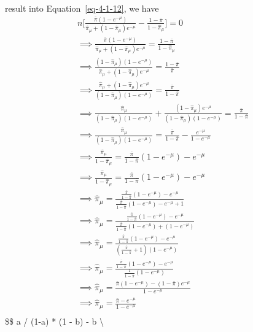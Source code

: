 \documentclass[
  12pt]{article}
\begin{document}
result into Equation~\ref{eq-4-1-12}, we have \[
\begin{aligned}
&n \Bigg[\frac{\bar{\pi}(1 - e^{-\mu})}{\hat{\pi}_{\mu} + (1-\hat{\pi}_{\mu})e^{-\mu}} - \frac{1 - \bar{\pi}}{1 - \hat{\pi}_{\mu}} \Bigg] = 0 \\
&\implies \frac{\bar{\pi}(1 - e^{-\mu})}{\hat{\pi}_{\mu} + (1-\hat{\pi}_{\mu})e^{-\mu}} = \frac{1 - \bar{\pi}}{1 - \hat{\pi}_{\mu}}  \\
&\implies \frac{(1 - \hat{\pi}_{\mu})(1 - e^{-\mu})}{\hat{\pi}_{\mu} + (1-\hat{\pi}_{\mu})e^{-\mu}} = \frac{1 - \bar{\pi}}{\bar{\pi}} \\
&\implies \frac{\hat{\pi}_{\mu} + (1-\hat{\pi}_{\mu})e^{-\mu}}{(1 - \hat{\pi}_{\mu})(1 - e^{-\mu})} = \frac{\bar{\pi}}{1 - \bar{\pi}} \\
&\implies \frac{\hat{\pi}_{\mu}}{(1 - \hat{\pi}_{\mu})(1 - e^{-\mu})} + \frac{(1-\hat{\pi}_{\mu})e^{-\mu}}{(1 - \hat{\pi}_{\mu})(1 - e^{-\mu})} = \frac{\bar{\pi}}{1 - \bar{\pi}} \\
&\implies \frac{\hat{\pi}_{\mu}}{(1 - \hat{\pi}_{\mu})(1 - e^{-\mu})} = \frac{\bar{\pi}}{1 - \bar{\pi}} - \frac{e^{-\mu}}{1 - e^{-\mu}} \\
&\implies \frac{\hat{\pi}_{\mu}}{1 - \hat{\pi}_{\mu}} = \frac{\bar{\pi}}{1 - \bar{\pi}}(1 - e^{-\mu}) - e^{-\mu} \\
&\implies \frac{\hat{\pi}_{\mu}}{1 - \hat{\pi}_{\mu}} = \frac{\bar{\pi}}{1 - \bar{\pi}}(1 - e^{-\mu}) - e^{-\mu} \\
&\implies \hat{\pi}_{\mu} = \frac{\frac{\bar{\pi}}{1 - \bar{\pi}}(1 - e^{-\mu}) - e^{-\mu}}{\frac{\bar{\pi}}{1 - \bar{\pi}}(1 - e^{-\mu}) - e^{-\mu} + 1} \\
&\implies \hat{\pi}_{\mu} = \frac{\frac{\bar{\pi}}{1 - \bar{\pi}}(1 - e^{-\mu}) - e^{-\mu}}{\frac{\bar{\pi}}{1 - \bar{\pi}}(1 - e^{-\mu}) + (1 - e^{-\mu})} \\
&\implies \hat{\pi}_{\mu} = \frac{\frac{\bar{\pi}}{1 - \bar{\pi}}(1 - e^{-\mu}) - e^{-\mu}}{(\frac{\bar{\pi}}{1 - \bar{\pi}} + 1)(1 - e^{-\mu})} \\
&\implies \hat{\pi}_{\mu} = \frac{\frac{\bar{\pi}}{1 - \bar{\pi}}(1 - e^{-\mu}) - e^{-\mu}}{\frac{1}{1 - \bar{\pi}}(1 - e^{-\mu})} \\
&\implies \hat{\pi}_{\mu} = \frac{\bar{\pi}(1 - e^{-\mu}) - (1 - \bar{\pi})e^{-\mu}}{1 - e^{-\mu}} \\
&\implies \hat{\pi}_{\mu} = \frac{\bar{\pi} - e^{-\mu}}{1 - e^{-\mu}} \\
\end{aligned}
\] \$\$ a / (1-a) * (1 - b) - b \textbackslash{}
\end{document}
